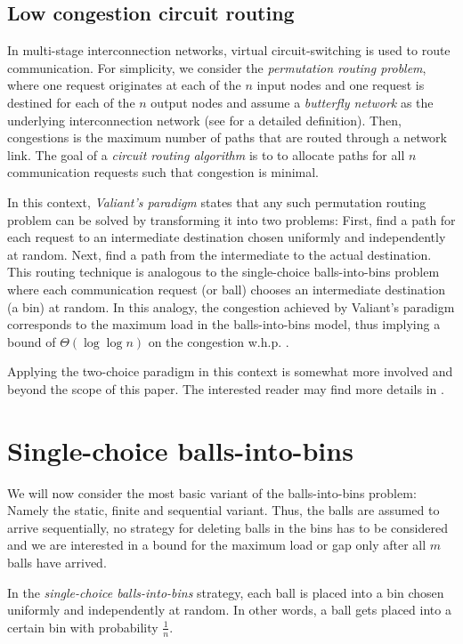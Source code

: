 \documentclass[a4paper,12pt]{article}
\begin{document}
\subsection{Low congestion circuit routing}
\label{sec:circuitrouting}
In multi-stage interconnection networks, virtual circuit-switching is used to route communication. For simplicity, we consider the \emph{permutation routing problem}, where one request originates at each of the $n$ input nodes and one request is destined for each of the $n$ output nodes and assume a \emph{butterfly network} as the underlying interconnection network (see \cite{CLR09} for a detailed definition). Then, congestions is the maximum number of paths that are routed through a network link. The goal of a \emph{circuit routing algorithm} is to to allocate paths for all $n$ communication requests such that congestion is minimal.

In this context, \emph{Valiant's paradigm} \cite{V82} states that any such permutation routing problem can be solved by transforming it into two problems: First, find a path for each request to an intermediate destination chosen uniformly and independently at random. Next, find a path from the intermediate to the actual destination. This routing technique is analogous to the single-choice balls-into-bins problem where each communication request (or ball) chooses an intermediate destination (a bin) at random. In this analogy, the congestion achieved by Valiant's paradigm corresponds to the maximum load in the balls-into-bins model, thus implying a bound of $\Theta\left(\log \log n\right)$ on the congestion w.h.p. \cite{CMM+98} \cite{MRS01}. 

Applying the two-choice paradigm in this context is somewhat more involved and beyond the scope of this paper. The interested reader may find more details in \cite{CMM+98}.

\section{Single-choice balls-into-bins}
\label{sec:single-choice}
We will now consider the most basic variant of the balls-into-bins problem: Namely the static, finite and sequential variant. Thus, the balls are assumed to arrive sequentially, no strategy for deleting balls in the bins has to be considered and we are interested in a bound for the maximum load or gap only after all $m$ balls have arrived. 

In the \emph{single-choice balls-into-bins} strategy, each ball is placed into a bin chosen uniformly and independently at random. In other words, a ball gets placed into a certain bin with probability $\frac{1}{n}$.
\end{document}
